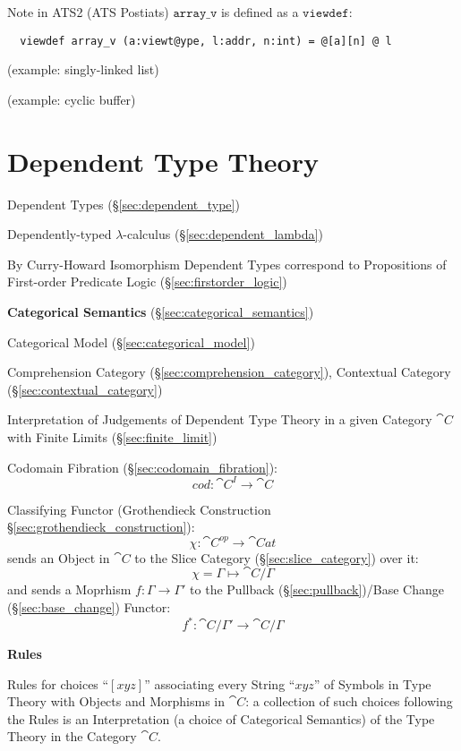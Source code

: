 \fist Note in ATS2 (ATS Postiats) $\mathtt{array\_v}$ is defined as a
$\mathtt{viewdef}$:
\begin{verbatim}
  viewdef array_v (a:viewt@ype, l:addr, n:int) = @[a][n] @ l
\end{verbatim}

(example: singly-linked list)

(example: cyclic buffer)



\endgroup



\section{Dependent Type Theory}\label{sec:dependent_type_theory}

Dependent Types (\S\ref{sec:dependent_type})

Dependently-typed $\lambda$-calculus (\S\ref{sec:dependent_lambda})

By Curry-Howard Isomorphism Dependent Types correspond to Propositions
of First-order Predicate Logic (\S\ref{sec:firstorder_logic})


\textbf{Categorical Semantics} (\S\ref{sec:categorical_semantics})

Categorical Model (\S\ref{sec:categorical_model})

Comprehension Category (\S\ref{sec:comprehension_category}),
Contextual Category (\S\ref{sec:contextual_category})

Interpretation of Judgements of Dependent Type Theory in a given
Category $\cat{C}$ with Finite Limits (\S\ref{sec:finite_limit})

Codomain Fibration (\S\ref{sec:codomain_fibration}):
\[
  cod:\cat{C}^I \rightarrow \cat{C}
\]

Classifying Functor (Grothendieck Construction
\S\ref{sec:grothendieck_construction}):
\[
  \chi : \cat{C}^{op} \rightarrow \cat{Cat}
\]
sends an Object in $\cat{C}$ to the Slice Category
(\S\ref{sec:slice_category}) over it:
\[
  \chi = \Gamma \mapsto \cat{C}/\Gamma
\]
and sends a Moprhism $f : \Gamma \rightarrow \Gamma'$ to the Pullback
(\S\ref{sec:pullback})/Base Change (\S\ref{sec:base_change}) Functor:
\[
  f^* : \cat{C}/\Gamma' \rightarrow \cat{C}/\Gamma
\]


\textbf{Rules}

Rules for choices ``$[xyz]$'' associating every String ``$xyz$'' of
Symbols in Type Theory with Objects and Morphisms in $\cat{C}$: a
collection of such choices following the Rules is an Interpretation (a
choice of Categorical Semantics) of the Type Theory in the Category
$\cat{C}$.

